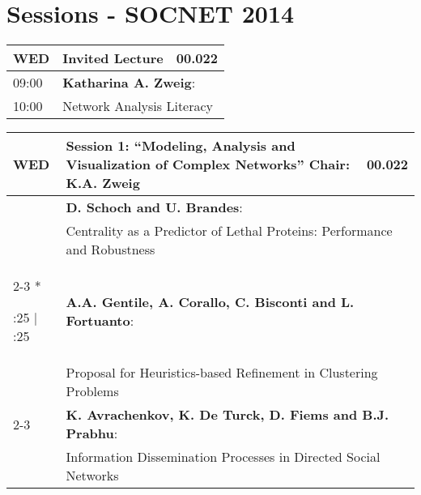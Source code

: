 \section{\textcolor{unibablueI}{Sessions - SOCNET 2014}}
\footnotesize
%
\newcommand\VertEntry[1]{%
  \multirow{3}*{%
    \begin{varwidth}{2em}%
    \centering #1%
    \end{varwidth}}}
%
\begin{longtable}{|p{2em}|p{5.5cm}|p{1cm}|}
\hline
\rowcolor{unibayellowV} \textcolor{unibablueI}{\textbf{WED}} & \textcolor{unibablueI}{\textbf{Invited Lecture}} & \textcolor{unibablueI}{\textbf{00.022}}\\
\hline
\endhead
09:00 & \multicolumn{2}{p{6.5cm}|}{\textbf{Katharina A. Zweig}:} \\
10:00 & \multicolumn{2}{p{6.5cm}|}{Network Analysis Literacy} \\
 \hline
\end{longtable}
\vspace{-2em}
\begin{longtable}{|p{2em}|p{5.5cm}|p{1cm}|}
\hline
\rowcolor{unibablueV} \textcolor{unibablueI}{\textbf{WED}} & \textcolor{unibablueI}{\textbf{Session 1: ``Modeling, Analysis and Visualization of Complex Networks'' Chair: K.A. Zweig}} & \textcolor{unibablueI}{\textbf{00.022}}\\
\hline
\endhead
 & \multicolumn{2}{p{6.5cm}|}{\textbf{D. Schoch and U. Brandes}:} \\
 & \multicolumn{2}{p{6.5cm}|}{Centrality as a Predictor of Lethal Proteins: Performance and Robustness} \\
 \cline{2-3}
\VertEntry{10:25 \qquad\quad $\vert$ \qquad 11:25} & \multicolumn{2}{p{6.5cm}|}{\textbf{A.A. Gentile, A. Corallo, C. Bisconti and L. Fortuanto}:} \\
 & \multicolumn{2}{p{6.5cm}|}{Proposal for Heuristics-based Refinement in Clustering Problems} \\
  \cline{2-3}
 & \multicolumn{2}{p{6.5cm}|}{\textbf{K. Avrachenkov, K. De Turck, D. Fiems and B.J. Prabhu}:} \\
 & \multicolumn{2}{p{6.5cm}|}{Information Dissemination Processes in Directed Social Networks} \\

 \hline
\end{longtable}
